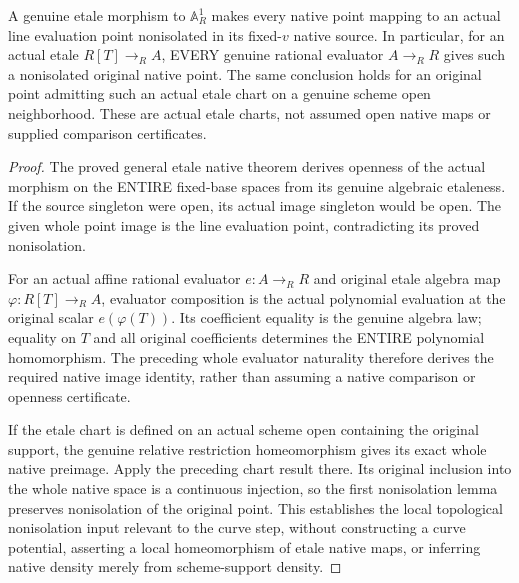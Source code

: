 \begin{theorem}
\label{scheme:actual-etale-curve-rational-nonisolation}
\leanok
{}
A genuine etale morphism to $\mathbb A^1_R$ makes every native
point mapping to an actual line evaluation point nonisolated in
its fixed-$v$ native source. In particular, for an actual etale
$R[T]\to_R A$, EVERY genuine rational evaluator $A\to_R R$
gives such a nonisolated original native point. The same conclusion
holds for an original point admitting such an actual etale chart
on a genuine scheme open neighborhood. These are actual etale
charts, not assumed open native maps or supplied comparison
certificates.
\end{theorem}
\begin{proof}
The proved general etale native theorem derives openness of the
actual morphism on the ENTIRE fixed-base spaces from its genuine
algebraic etaleness. If the source singleton were open, its actual
image singleton would be open. The given whole point image is the
line evaluation point, contradicting its proved nonisolation.

For an actual affine rational evaluator $e:A\to_R R$ and original
etale algebra map $\varphi:R[T]\to_R A$, evaluator composition
is the actual polynomial evaluation at the original scalar
$e(\varphi(T))$. Its coefficient equality is the genuine algebra
law; equality on $T$ and all original coefficients determines the
ENTIRE polynomial homomorphism. The preceding whole evaluator
naturality therefore derives the required native image identity,
rather than assuming a native comparison or openness certificate.

If the etale chart is defined on an actual scheme open containing
the original support, the genuine relative restriction
homeomorphism gives its exact whole native preimage. Apply the
preceding chart result there. Its original inclusion into the
whole native space is a continuous injection, so the first
nonisolation lemma preserves nonisolation of the original point.
This establishes the local topological nonisolation input relevant
to the curve step, without constructing a curve potential,
asserting a local homeomorphism of etale native maps, or inferring
native density merely from scheme-support density.
\end{proof}
